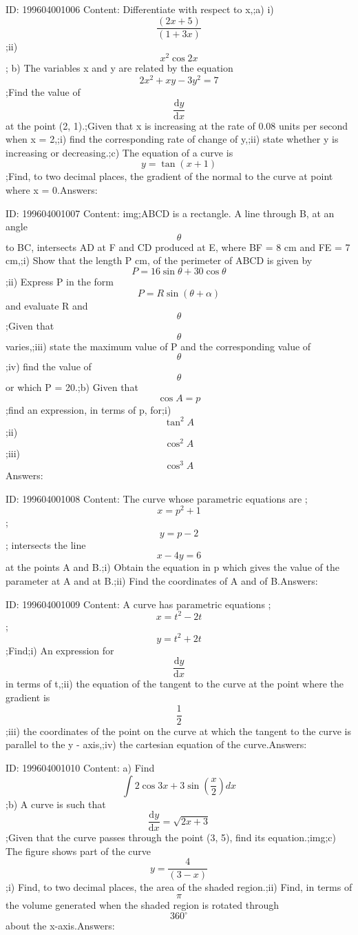 \documentclass{article}
\begin{document}
ID: 199604001006
Content:
Differentiate with respect to x,;a) i) \[\frac{(2x+5)}{(1+3x)}\];ii) \[x^2\cos 2x\]; b) The variables x and y are related by the equation \[2x^2+xy-3y^2=7\];Find the value of \[\frac{\mathrm{d} y}{\mathrm{d} x}\] at the point (2, 1).;Given that x is increasing at the rate of 0.08 units per second when x = 2,;i) find the corresponding rate of change of y,;ii) state whether y is increasing or decreasing.;c) The equation of a curve is \[y=\tan (x+1)\];Find, to two decimal places, the gradient of the normal to the curve at point where x = 0.Answers:

ID: 199604001007
Content:
img;ABCD is a rectangle. A line through B, at an angle \[\theta \] to BC, intersects AD at F and CD produced at E, where BF = 8 cm and FE = 7 cm,;i) Show that the length P cm, of the perimeter of ABCD is given by \[P=16\sin \theta +30\cos \theta \];ii) Express P in the form \[P=R\sin(\theta+\alpha)\] and evaluate R and \[\theta \];Given that \[\theta \] varies,;iii) state the maximum value of P and the corresponding  value of \[\theta \] ;iv) find the value of \[\theta \] or which P = 20.;b) Given that \[\cos A = p\];find an expression, in terms of p, for;i) \[\tan^2A\];ii) \[\cos^2A\];iii) \[\cos^3A\]Answers:

ID: 199604001008
Content:
The curve whose parametric equations are ;\[x=p^2+1\] ; \[y=p-2\]; intersects the line \[x-4y=6\] at the points A and B.;i) Obtain the equation in p which gives the value of the parameter at A and at B.;ii) Find the coordinates of A and of  B.Answers:

ID: 199604001009
Content:
A curve has parametric equations ; \[x=t^2-2t\]; \[y=t^2+2t\];Find;i) An expression for \[\frac{\mathrm{d} y}{\mathrm{d} x}\] in terms of t,;ii) the equation of the tangent to the curve at the point where the gradient is \[\frac{1}{2}\];iii) the coordinates of the point on the curve at which the tangent to the curve is parallel to the y -  axis,;iv) the cartesian equation of the curve.Answers:

ID: 199604001010
Content:
a) Find \[\int 2\cos 3x+3\sin (\frac{x}{2})dx\];b) A curve is such that \[\frac{\mathrm{d} y}{\mathrm{d} x}=\sqrt{2x+3}\];Given that the curve passes through the point (3, 5), find its equation.;img;c) The figure shows part of the curve \[y=\frac{4}{(3-x)}\];i) Find, to two decimal places, the area of the shaded region.;ii) Find, in terms of \[\pi \]  the volume generated when the shaded region is rotated through \[360^{\circ}\] about the x-axis.Answers:
\end{document}
